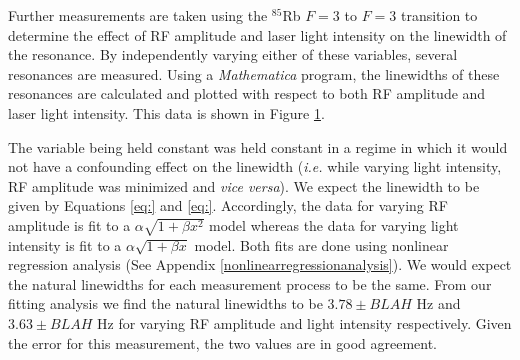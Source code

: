Further measurements are taken using the $^{85}$Rb $F=3$ to $F=3$ transition to determine the effect of RF amplitude and laser light intensity on the linewidth of the resonance. By independently varying either of these variables, several resonances are measured.  Using a \emph{Mathematica} program, the linewidths of these resonances are calculated and plotted with respect to both RF amplitude and laser light intensity.  This data is shown in Figure \ref{fig:linewidths}.
\begin{figure}[h!]
\begin{center}
\hspace{-1mm}
\vspace{-2mm}
\vspace{-2mm}
\caption{\small{}}
\label{fig:linewidths}
\end{center}
\end{figure}
The variable being held constant was held constant in a regime in which it would not have a confounding effect on the linewidth (\emph{i.e.} while varying light intensity, RF amplitude was minimized and \emph{vice versa}).  We expect the linewidth to be given by 
Equations \ref{eq:} and \ref{eq:}. Accordingly, the data for varying RF amplitude is fit to a $\alpha \sqrt{1+\beta x^2}$ model whereas the data for varying light intensity is fit to a $\alpha \sqrt{1+\beta x}$ model.  Both fits are done using nonlinear regression analysis (See Appendix \ref{nonlinearregressionanalysis}).  We would expect the natural linewidths for each measurement process to be the same.  From our fitting analysis we find the natural linewidths to be $3.78 \pm BLAH$ Hz and $3.63 \pm BLAH$ Hz for varying RF amplitude and light intensity respectively.  Given the error for this measurement, the two values are in good agreement. 

